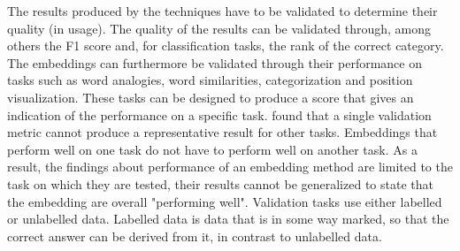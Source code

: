 \documentclass[../../Thesis.tex]{subfiles}
\begin{document}
The results produced by the techniques have to be validated to determine their quality (in usage). The quality of the results can be validated through, among others the F1 score and, for classification tasks, the rank of the correct category. The embeddings can furthermore be validated through their performance on tasks such as word analogies, word similarities, categorization and position visualization. These tasks can be designed to produce a score that gives an indication of the performance on a specific task. \citet{schnabel2015evaluation} found that a single validation metric cannot produce a representative result for other tasks. Embeddings that perform well on one task do not have to perform well on another task. As a result, the findings about performance of an embedding method are limited to the task on which they are tested, their results cannot be generalized to state that the embedding are overall "performing well".
Validation tasks use either labelled or unlabelled data. Labelled data is data that is in some way marked, so that the correct answer can be derived from it, in contrast to unlabelled data. 
\end{document}
